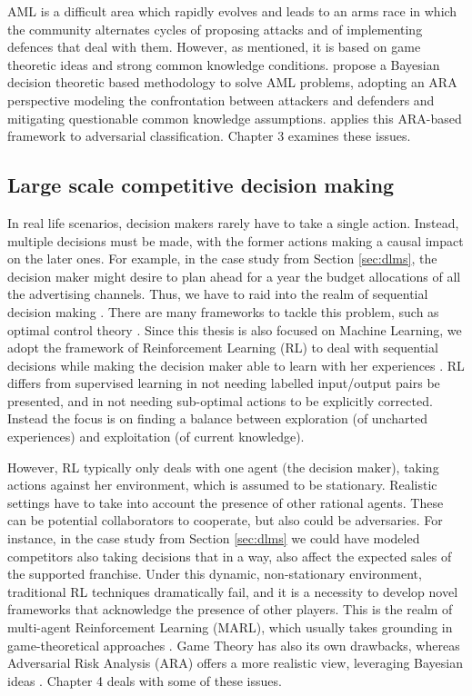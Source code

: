 AML is a  difficult area which rapidly evolves and leads to an 
arms race in which the community alternates cycles of proposing attacks and  of implementing defences that deal with them. However, as mentioned, it is 
based on game theoretic ideas and strong common
knowledge conditions. 
\cite{AMLARA} propose a
Bayesian decision theoretic based methodology 
to solve AML problems, 
adopting an ARA perspective \cite{adversarialRiskAnalysis2009,banks2015adversarial} modeling the confrontation between attackers and defenders and mitigating questionable common knowledge assumptions. \cite{math8111957} applies this ARA-based framework to  adversarial classification. Chapter 3 examines these issues.





\subsection{Large scale competitive decision making}

In real life scenarios, decision makers rarely have to take a single action. Instead, multiple decisions must be made, with the former actions making a causal impact on the later ones. For example, in the case study from Section \ref{sec:dlms}, the decision maker might desire to plan ahead for a year the budget allocations of all the advertising channels. Thus, we have to raid into the realm of sequential decision making \cite{french2000statistical,DIEDERICH200113917}. There are many frameworks to tackle this problem, such as optimal control theory \cite{kirk2004optimal}. Since this thesis is also focused on Machine Learning, we adopt the framework of Reinforcement Learning (RL) to deal with sequential decisions while making the decision maker able to learn with her experiences \cite{sutton2012reinforcement,kaelbling1996reinforcement}. RL differs from supervised learning in not needing labelled input/output pairs be presented, and in not needing sub-optimal actions to be explicitly corrected. Instead the focus is on finding a balance between exploration (of uncharted experiences) and exploitation (of current knowledge).

However, RL typically only deals with one agent (the decision maker), taking actions against her environment, which is assumed to be stationary. Realistic settings have to take into account the presence of other rational agents. These can be potential collaborators to cooperate, but also could be adversaries. For instance, in the case study from Section \ref{sec:dlms} we could have modeled competitors also taking decisions that in a way, also affect the expected sales of the supported franchise. Under this dynamic, non-stationary environment, traditional RL techniques dramatically fail, and it is a necessity to develop novel frameworks that acknowledge the presence of other players. This is the realm of multi-agent Reinforcement Learning (MARL), which usually takes grounding in game-theoretical approaches \cite{marl_over,lanctot2017unified}. Game Theory has also its own drawbacks, whereas Adversarial Risk Analysis (ARA) offers a more realistic view, leveraging Bayesian ideas \cite{Banks}.
Chapter 4 deals with some of these issues.


